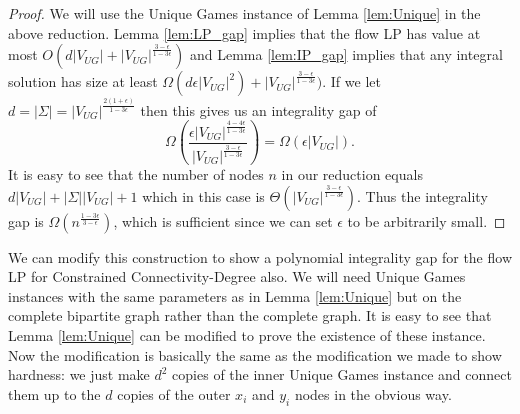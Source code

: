\documentclass[11pt,letterpaper]{article}
\theoremstyle{definition}
\begin{document}
  \begin{proof}
    We will use the Unique Games instance of Lemma \ref{lem:Unique}
    in the above reduction.  Lemma \ref{lem:LP_gap} implies that the
    flow LP has value at most $O(d |V_{UG}| +
    |V_{UG}|^{\frac{3-\epsilon}{1-3\epsilon}})$ and Lemma
    \ref{lem:IP_gap} implies that any integral solution has size at
    least $\Omega(d\epsilon|V_{UG}|^2) +
    |V_{UG}|^{\frac{3-\epsilon}{1-3\epsilon}})$.  If we let $d = |\Sigma| =
    |V_{UG}|^{\frac{2(1+\epsilon)}{1-3\epsilon}}$ then this gives us an
    integrality gap of
  \begin{equation*}
    \Omega\left(\frac{\epsilon |V_{UG}|^{\frac{4-4\epsilon}{1-3\epsilon}}}{|V_{UG}|^{\frac{3-\epsilon}{1-3\epsilon}}}\right) = \Omega\left(\epsilon|V_{UG}|\right).
  \end{equation*}
  It is easy to see that the number of nodes $n$ in our reduction
  equals $d|V_{UG}| + |\Sigma||V_{UG}|+1$ which in this case is
  $\Theta(|V_{UG}|^{\frac{3-\epsilon}{1-3\epsilon}})$.  Thus the integrality
  gap is $\Omega(n^{\frac{1-3\epsilon}{3-\epsilon}})$, which is
  sufficient since we can set $\epsilon$ to be arbitrarily small.
\end{proof}

We can modify this construction to show a polynomial integrality gap for the flow LP for {\sc Constrained Connectivity-Degree} also.  We will need Unique Games instances with the same parameters as in Lemma \ref{lem:Unique} but on the complete bipartite graph rather than the complete graph.  It is easy to see that Lemma \ref{lem:Unique} can be modified to prove the existence of these instance.  Now the modification is basically the same as the modification we made to show hardness: we just make $d^2$ copies of the inner Unique Games instance and connect them up to the $d$ copies of the outer $x_i$ and $y_i$ nodes in the obvious way.
\end{document}
